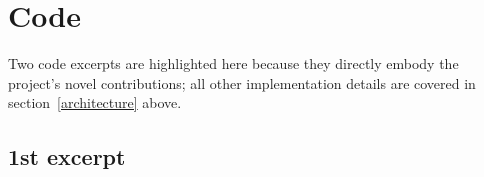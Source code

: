 \documentclass{article}
\begin{document}

%

\section{Code}

Two code excerpts are highlighted here because they directly embody the project's novel contributions; all other implementation details are covered in section~\ref{architecture} above.

\subsection{1st excerpt}
\end{document}

